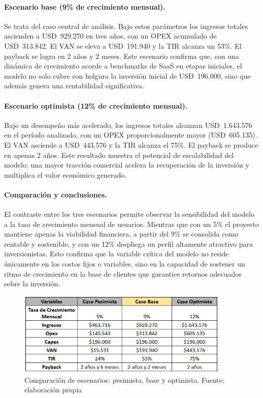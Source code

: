 \paragraph{Escenario base (9\% de crecimiento mensual).}  
Se trata del caso central de análisis. Bajo estos parámetros los ingresos totales ascienden a USD~929.270 en tres años, con un OPEX acumulado de USD~313.842. El VAN se eleva a USD~191.940 y la TIR alcanza un 53\%. El payback se logra en 2 años y 2 meses. Este escenario confirma que, con una dinámica de crecimiento acorde a benchmarks de SaaS en etapas iniciales, el modelo no solo cubre con holgura la inversión inicial de USD~196.000, sino que además genera una rentabilidad significativa.

\paragraph{Escenario optimista (12\% de crecimiento mensual).}  
Bajo un desempeño más acelerado, los ingresos totales alcanzan USD~1.643.576 en el período analizado, con un OPEX proporcionalmente mayor (USD~605.135). El VAN asciende a USD~443.576 y la TIR alcanza el 75\%. El payback se produce en apenas 2 años. Este resultado muestra el potencial de escalabilidad del modelo: una mayor tracción comercial acelera la recuperación de la inversión y multiplica el valor económico generado.

\paragraph{Comparación y conclusiones.}  
El contraste entre los tres escenarios permite observar la sensibilidad del modelo a la tasa de crecimiento mensual de usuarios. Mientras que con un 5\% el proyecto mantiene apenas la viabilidad financiera, a partir del 9\% se consolida como rentable y sostenible, y con un 12\% despliega un perfil altamente atractivo para inversionistas. Esto confirma que la variable crítica del modelo no reside únicamente en los costos fijos o variables, sino en la capacidad de sostener un ritmo de crecimiento en la base de clientes que garantice retornos adecuados sobre la inversión.


\begin{figure}[!htbp]
  \centering
  \includegraphics[width=0.9\textwidth]{images/AnalisisFinal.PNG}
  \caption{Comparación de escenarios: pesimista, base y optimista. Fuente: elaboración propia}
  \label{fig:analisis-final}
\end{figure}